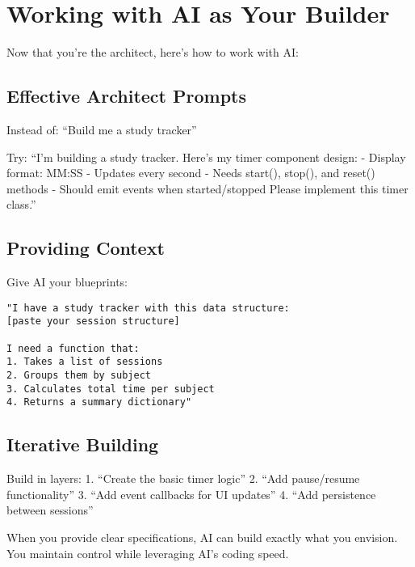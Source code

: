 \documentclass[
  letterpaper,
  DIV=11,
  numbers=noendperiod,
  oneside]{scrreprt}
\begin{document}
\section{Working with AI as Your
Builder}\label{working-with-ai-as-your-builder}

Now that you're the architect, here's how to work with AI:

\subsection{Effective Architect
Prompts}\label{effective-architect-prompts}

Instead of: ``Build me a study tracker''

Try: ``I'm building a study tracker. Here's my timer component design: -
Display format: MM:SS - Updates every second - Needs start(), stop(),
and reset() methods - Should emit events when started/stopped Please
implement this timer class.''

\subsection{Providing Context}\label{providing-context}

Give AI your blueprints:

\begin{verbatim}
"I have a study tracker with this data structure:
[paste your session structure]

I need a function that:
1. Takes a list of sessions
2. Groups them by subject
3. Calculates total time per subject
4. Returns a summary dictionary"
\end{verbatim}

\subsection{Iterative Building}\label{iterative-building}

Build in layers: 1. ``Create the basic timer logic'' 2. ``Add
pause/resume functionality'' 3. ``Add event callbacks for UI updates''
4. ``Add persistence between sessions''

\begin{tcolorbox}[enhanced jigsaw, opacityback=0, colback=white, colframe=quarto-callout-tip-color-frame, breakable, titlerule=0mm, coltitle=black, rightrule=.15mm, colbacktitle=quarto-callout-tip-color!10!white, left=2mm, bottomtitle=1mm, bottomrule=.15mm, title=\textcolor{quarto-callout-tip-color}{\faLightbulb}\hspace{0.5em}{The Architect's Advantage}, opacitybacktitle=0.6, toptitle=1mm, leftrule=.75mm, arc=.35mm, toprule=.15mm]

When you provide clear specifications, AI can build exactly what you
envision. You maintain control while leveraging AI's coding speed.

\end{tcolorbox}
\end{document}
